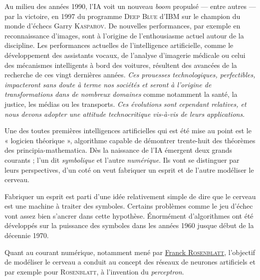 Au milieu des années 1990, l’IA voit un nouveau \textit{boom} propulsé --- entre autres --- par la victoire, en 1997 du programme \textsc{Deep Blue} d’IBM sur le champion du monde d’échecs Garry \textsc{Kasparov}. De nouvelles performances, par exemple en reconnaissance d’images, sont à l’origine de l’enthousiasme actuel autour de la discipline. Les performances actuelles de l'intelligence artificielle, comme le développement des assistants vocaux, de l’analyse d’imagerie médicale ou celui des mécanismes intelligents à bord des voitures, résultent des avancées de la recherche de ces vingt dernières années. \emph{Ces prouesses technologiques, perfectibles, impacteront sans doute à terme nos sociétés et seront à l’origine de transformations dans de nombreux domaines} comme notamment la santé, la justice, les médias ou les transports. \emph{Ces évolutions sont cependant relatives, et nous devons adopter une attitude technocritique vis-à-vis de leurs applications}. 

Une des toutes premières intelligences artificielles qui est été mise au point est le « logicien théorique », algorithme capable de démontrer trente-huit des théorèmes des \gls{principia-mathematica}. Dès la naissance de l'IA émergent deux grands courants ; l'un dit \emph{symbolique} et l'autre \emph{numérique}. Ils vont se distinguer par leurs perspectives, d'un coté on veut fabriquer un esprit et de l'autre modéliser le cerveau.

Fabriquer un esprit est parti d'une idée relativement simple de dire que le cerveau est une machine à traiter des symboles. Certains problèmes comme le jeu d'échec vont assez bien s'ancrer dans cette hypothèse. Énormément d'algorithmes ont été développés sur la puissance des symboles dans les années 1960 jusque début de la décennie 1970.

Quant au courant numérique, notamment mené par \href{https://fr.wikipedia.org/wiki/Frank_Rosenblatt}{Franck \textsc{Rosenblatt}}, l'objectif de modéliser le cerveau a conduit au concept des réseaux de neurones artificiels et par exemple pour \textsc{Rosenblatt}, à l'invention du \emph{\gls{perceptron}}.


